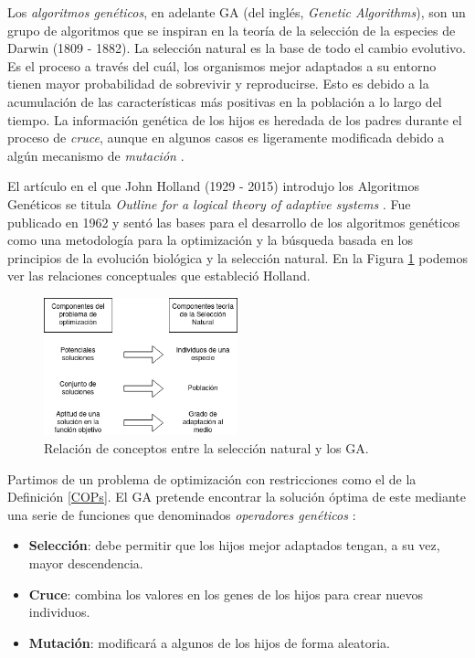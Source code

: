 \documentclass[12pt,a4paper]{book}
\begin{document}
Los \textsl{algoritmos genéticos}, en adelante GA (del inglés, \textsl{Genetic Algorithms}), son un grupo de algoritmos que se inspiran en la teoría de la selección de la especies de Darwin (1809 - 1882). La selección natural es la base de todo el cambio evolutivo. Es el proceso a través del cuál, los organismos mejor adaptados a su entorno tienen mayor probabilidad de sobrevivir y reproducirse. Esto es debido a la acumulación de las características más positivas en la población a lo largo del tiempo. La información genética de los hijos es heredada de los padres durante el proceso de \textsl{cruce}, aunque en algunos casos es ligeramente modificada debido a algún mecanismo de \textsl{mutación} \cite{e_besada_optimizacion_nodate}.

El artículo en el que John Holland (1929 - 2015) introdujo los Algoritmos Genéticos se titula \textsl{Outline for a logical theory of adaptive systems} \cite{holland_outline_1962}. Fue publicado en 1962 y sentó las bases para el desarrollo de los algoritmos genéticos como una metodología para la optimización y la búsqueda basada en los principios de la evolución biológica y la selección natural. En la Figura \ref{fig:analogia_ga} podemos ver las relaciones conceptuales que estableció Holland. 

\begin{figure}[h]
    \begin{center}
    \includegraphics[width=0.5\textwidth]{img/analogia_ga.png}
    \end{center}
    \caption{Relación de conceptos entre la selección natural y los GA.}
    \label{fig:analogia_ga}
\end{figure} 

Partimos de un problema de optimización con restricciones como el de la Definición \ref{COPs}. El GA pretende encontrar la solución óptima de este mediante una serie de funciones que denominados \textsl{operadores genéticos} \cite{yu_introduction_2010}:

\begin{itemize}
	\item \textbf{Selección}: debe permitir que los hijos mejor adaptados tengan, a su vez, mayor descendencia.
	\item \textbf{Cruce}: combina los valores en los genes de los hijos para crear nuevos individuos.
	\item \textbf{Mutación}: modificará a algunos de los hijos de forma aleatoria. 
\end{itemize}
\end{document}
